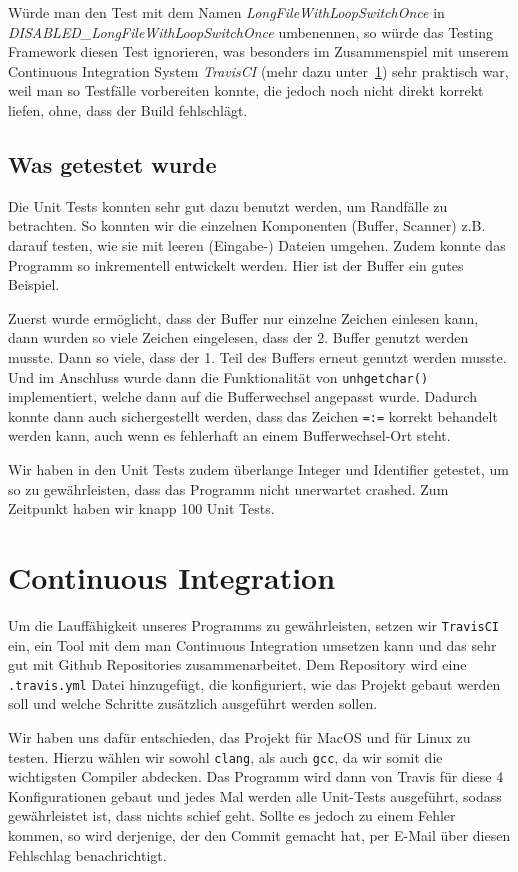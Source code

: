 Würde man den Test mit dem Namen \emph{LongFileWithLoopSwitchOnce} in \emph{DISABLED\-\_LongFileWithLoopSwitchOnce} umbenennen, so würde das Testing Framework diesen Test ignorieren, was besonders im Zusammenspiel mit unserem Continuous Integration System \textit{TravisCI} (mehr dazu unter~\ref{sec:ContinousIntegration}) sehr praktisch war, weil man so Testfälle vorbereiten konnte, die jedoch noch nicht direkt korrekt liefen, ohne, dass der Build fehlschlägt.

\subsection{Was getestet wurde}
Die Unit Tests konnten sehr gut dazu benutzt werden, um Randfälle zu betrachten. So konnten wir die einzelnen Komponenten (Buffer, Scanner) z.B. darauf testen, wie sie mit leeren (Eingabe-) Dateien umgehen. Zudem konnte das Programm so inkrementell entwickelt werden. Hier ist der Buffer ein gutes Beispiel.

Zuerst wurde ermöglicht, dass der Buffer nur einzelne Zeichen einlesen kann, dann wurden so viele Zeichen eingelesen, dass der 2. Buffer genutzt werden musste. Dann so viele, dass der 1. Teil des Buffers erneut genutzt werden musste. Und im Anschluss wurde dann die Funktionalität von \texttt{unhgetchar()} implementiert, welche dann auf die Bufferwechsel angepasst wurde. Dadurch konnte dann auch sichergestellt werden, dass das Zeichen \texttt{=:=} korrekt behandelt werden kann, auch wenn es fehlerhaft an einem Bufferwechsel-Ort steht.

Wir haben in den Unit Tests zudem überlange Integer und Identifier getestet, um so zu gewährleisten, dass das Programm nicht unerwartet crashed. Zum Zeitpunkt haben wir knapp 100 Unit Tests.

\section{Continuous Integration}\label{sec:ContinousIntegration}
Um die Lauffähigkeit unseres Programms zu gewährleisten, setzen wir \texttt{TravisCI} ein, ein Tool mit dem man Continuous Integration umsetzen kann und das sehr gut mit Github Repositories zusammenarbeitet. Dem Repository wird eine \texttt{.travis.yml} Datei hinzugefügt, die konfiguriert, wie das Projekt gebaut werden soll und welche Schritte zusätzlich ausgeführt werden sollen.

Wir haben uns dafür entschieden, das Projekt für MacOS und für Linux zu testen. Hierzu wählen wir sowohl \texttt{clang}, als auch \texttt{gcc}, da wir somit die wichtigsten Compiler abdecken. Das Programm wird dann von Travis für diese 4 Konfigurationen gebaut und jedes Mal werden alle Unit-Tests ausgeführt, sodass gewährleistet ist, dass nichts schief geht. Sollte es jedoch zu einem Fehler kommen, so wird derjenige, der den Commit gemacht hat, per E-Mail über diesen Fehlschlag benachrichtigt.

